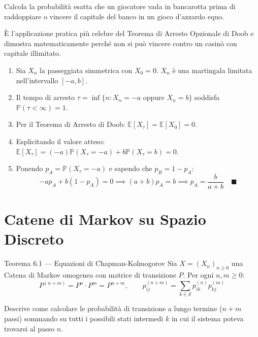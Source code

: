 \documentclass[11pt,a4paper]{report}
\newcommand{\PP}{\mathbb{P}}
\newcommand{\E}{\mathbb{E}}
\newcommand{\1}{\mathbf{1}}
\begin{document}
\begin{cosafa}
Calcola la probabilità esatta che un giocatore vada in bancarotta prima di raddoppiare o vincere il capitale del banco in un gioco d'azzardo equo.
\end{cosafa}

\begin{acosaserve}
È l'applicazione pratica più celebre del Teorema di Arresto Opzionale di Doob e dimostra matematicamente perché non si può vincere contro un casinò con capitale illimitato.
\end{acosaserve}

\begin{dimostrazione}
\begin{enumerate}
    \item Sia $X_n$ la passeggiata simmetrica con $X_0 = 0$. $X_n$ è una martingala limitata nell'intervallo $[-a, b]$.
    \item Il tempo di arresto $\tau = \inf\{n : X_n = -a \text{ oppure } X_n = b\}$ soddisfa $\PP(\tau < \infty) = 1$.
    \item Per il Teorema di Arresto di Doob: $\E[X_\tau] = \E[X_0] = 0$.
    \item Esplicitando il valore atteso: $\E[X_\tau] = (-a)\PP(X_\tau = -a) + b \PP(X_\tau = b) = 0$.
    \item Ponendo $p_A = \PP(X_\tau = -a)$ e sapendo che $p_B = 1 - p_A$:
    \[ -a p_A + b(1 - p_A) = 0 \implies (a+b)p_A = b \implies p_A = \frac{b}{a+b} \quad \blacksquare \]
\end{enumerate}
\end{dimostrazione}

\newpage

\chapter{Catene di Markov su Spazio Discreto}

\begin{teoremabox}{Teorema 6.1 --- Equazioni di Chapman-Kolmogorov}
Sia $X = (X_n)_{n \ge 0}$ una Catena di Markov omogenea con matrice di transizione $P$. Per ogni $n, m \ge 0$:
\[ P^{(n+m)} = P^n \cdot P^m = P^{n+m}, \qquad p_{ij}^{(n+m)} = \sum_{k \in \mathcal{S}} p_{ik}^{(n)} p_{kj}^{(m)} \]
\end{teoremabox}

\begin{cosafa}
Descrive come calcolare le probabilità di transizione a lungo termine ($n+m$ passi) sommando su tutti i possibili stati intermedi $k$ in cui il sistema poteva trovarsi al passo $n$.
\end{cosafa}
\end{document}
